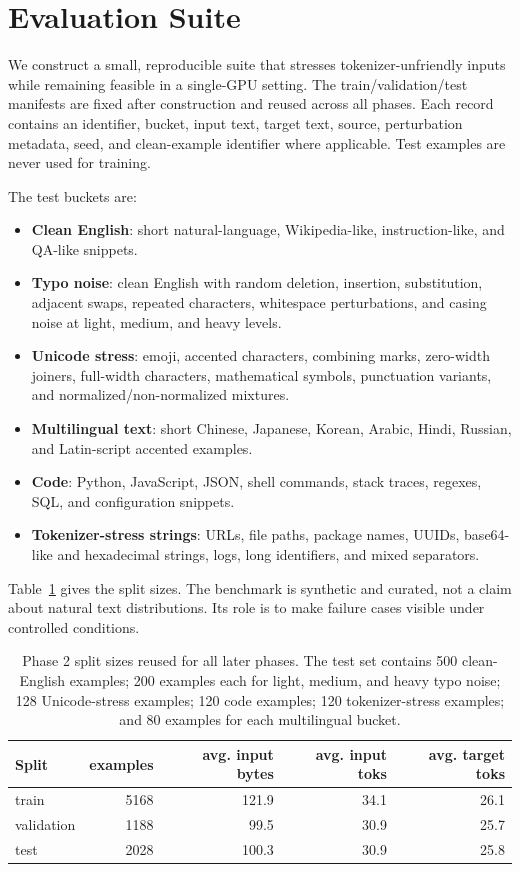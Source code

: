 \documentclass{article}
\begin{document}
\section{Evaluation Suite}

We construct a small, reproducible suite that stresses tokenizer-unfriendly inputs while remaining feasible in a single-GPU setting. The train/validation/test manifests are fixed after construction and reused across all phases. Each record contains an identifier, bucket, input text, target text, source, perturbation metadata, seed, and clean-example identifier where applicable. Test examples are never used for training.

The test buckets are:
\begin{itemize}
    \item \textbf{Clean English}: short natural-language, Wikipedia-like, instruction-like, and QA-like snippets.
    \item \textbf{Typo noise}: clean English with random deletion, insertion, substitution, adjacent swaps, repeated characters, whitespace perturbations, and casing noise at light, medium, and heavy levels.
    \item \textbf{Unicode stress}: emoji, accented characters, combining marks, zero-width joiners, full-width characters, mathematical symbols, punctuation variants, and normalized/non-normalized mixtures.
    \item \textbf{Multilingual text}: short Chinese, Japanese, Korean, Arabic, Hindi, Russian, and Latin-script accented examples.
    \item \textbf{Code}: Python, JavaScript, JSON, shell commands, stack traces, regexes, SQL, and configuration snippets.
    \item \textbf{Tokenizer-stress strings}: URLs, file paths, package names, UUIDs, base64-like and hexadecimal strings, logs, long identifiers, and mixed separators.
\end{itemize}

Table~\ref{tab:data} gives the split sizes. The benchmark is synthetic and curated, not a claim about natural text distributions. Its role is to make failure cases visible under controlled conditions.

\begin{table}[t]
\centering
\small
\begin{tabular}{lrrrr}
\toprule
Split & examples & avg. input bytes & avg. input toks & avg. target toks \\
\midrule
train & 5168 & 121.9 & 34.1 & 26.1 \\
validation & 1188 & 99.5 & 30.9 & 25.7 \\
test & 2028 & 100.3 & 30.9 & 25.8 \\
\bottomrule
\end{tabular}
\caption{Phase 2 split sizes reused for all later phases. The test set contains 500 clean-English examples; 200 examples each for light, medium, and heavy typo noise; 128 Unicode-stress examples; 120 code examples; 120 tokenizer-stress examples; and 80 examples for each multilingual bucket.}
\label{tab:data}
\end{table}
\end{document}
